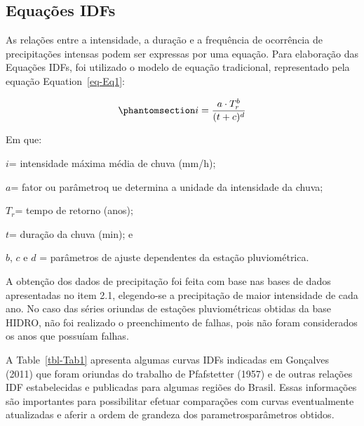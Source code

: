 \documentclass[
]{agujournal2019}
\begin{document}
\subsection{Equações IDFs}\label{equauxe7uxf5es-idfs}

As relações entre a intensidade, a duração e a frequência de ocorrência
de precipitações intensas podem ser expressas por uma equação. Para
elaboração das Equações IDFs, foi utilizado o modelo de equação
tradicional, representado pela equação Equation~\ref{eq-Eq1}:

\begin{equation}\phantomsection\label{eq-Eq1}{
i=\frac{a \cdot T_{r}^{b}}{(t+c)^{d}}
}\end{equation}

Em que:

\(i\)= intensidade máxima média de chuva (mm/h);

\(a\)= fator ou parâmetroq ue determina a unidade da intensidade da
chuva;

\(T_{r}\)= tempo de retorno (anos);

\(t\)= duração da chuva (min); e

\(b\), \(c\) e \(d\) = parâmetros de ajuste dependentes da estação
pluviométrica.

A obtenção dos dados de precipitação foi feita com base nas bases de
dados apresentadas no item 2.1, elegendo-se a precipitação de maior
intensidade de cada ano. No caso das séries oriundas de estações
pluviométricas obtidas da base HIDRO, não foi realizado o preenchimento
de falhas, pois não foram considerados os anos que possuíam falhas.

A Table~\ref{tbl-Tab1} apresenta algumas curvas IDFs indicadas em
Gonçalves (2011) que foram oriundas do trabalho de Pfafstetter (1957) e
de outras relações IDF estabelecidas e publicadas para algumas regiões
do Brasil. Essas informações são importantes para possibilitar efetuar
comparações com curvas eventualmente atualizadas e aferir a ordem de
grandeza dos parametrosparâmetros obtidos.
\end{document}

